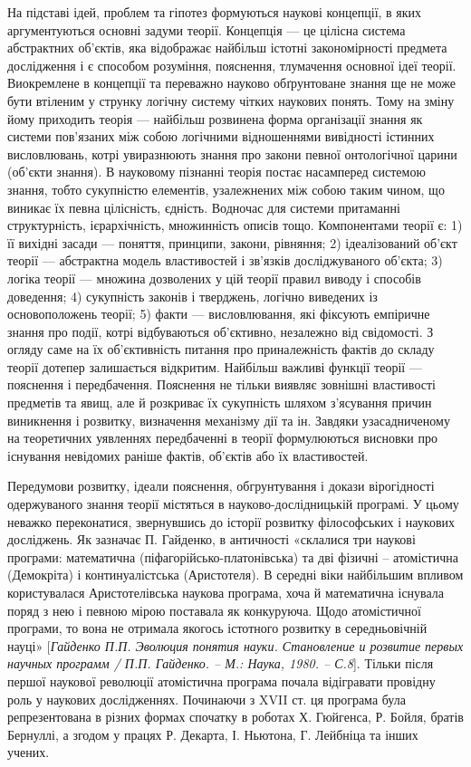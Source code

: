 На підставі ідей, проблем та гіпотез формуються наукові концепції, в яких
аргументуються основні задуми теорії. Концепція --- це цілісна система
абстрактних об’єктів, яка відображає найбільш істотні закономірності предмета
дослідження і є способом розуміння, пояснення, тлумачення основної ідеї
теорії. Виокремлене в концепції та переважно науково обґрунтоване знання ще
не може бути втіленим у струнку логічну систему чітких наукових понять.
Тому на зміну йому приходить теорія --- найбільш розвинена форма організації
знання як системи пов’язаних між собою логічними відношеннями вивідності
істинних висловлювань, котрі увиразнюють знання про закони певної
онтологічної царини (об’єкти знання). В науковому пізнанні теорія постає
насамперед системою знання, тобто сукупністю елементів, узалежнених між
собою таким чином, що виникає їх певна цілісність, єдність. Водночас для
системи притаманні структурність, ієрархічність, множинність описів тощо.
Компонентами теорії є: 1) її вихідні засади --- поняття, принципи, закони,
рівняння; 2) ідеалізований об’єкт теорії --- абстрактна модель властивостей і
зв’язків досліджуваного об’єкта; 3) логіка теорії --- множина дозволених у цій
теорії правил виводу і способів доведення; 4) сукупність законів і тверджень,
логічно виведених із основоположень теорії; 5) факти --- висловлювання, які
фіксують емпіричне знання про події, котрі відбуваються об’єктивно,
незалежно від свідомості. З огляду саме на їх об’єктивність питання про
приналежність фактів до складу теорії дотепер залишається відкритим.
Найбільш важливі функції теорії --- пояснення і передбачення. Пояснення не
тільки виявляє зовнішні властивості предметів та явищ, але й розкриває їх
сукупність шляхом з’ясування причин виникнення і розвитку, визначення
механізму дії та ін. Завдяки узасадниченому на теоретичних уявленнях
передбаченні в теорії формулюються висновки про існування невідомих раніше
фактів, об’єктів або їх властивостей.

Передумови розвитку, ідеали пояснення, обгрунтування і докази
вірогідності одержуваного знання теорії містяться в науково-дослідницькій
програмі. У цьому неважко переконатися, звернувшись до історії розвитку
філософських і наукових досліджень. Як зазначає П. Гайденко, в античності
«склалися три наукові програми: математична (піфагорійсько-платонівська) та
дві фізичні – атомістична (Демокріта) і континуалістська (Аристотеля). В
середні віки найбільшим впливом користувалася Аристотелівська наукова
програма, хоча й математична існувала поряд з нею і певною мірою поставала
як конкуруюча. Щодо атомістичної програми, то вона не отримала якогось
істотного розвитку в середньовічній науці» [\textit{Гайденко П.П. Эволюция понятия
науки. Становление и розвитие первых научных программ / П.П. Гайденко. –
М.: Наука, 1980. – С.8}]. Тільки після першої наукової революції атомістична
програма почала відігравати провідну роль у наукових дослідженнях.
Починаючи з XVII ст. ця програма була репрезентована в різних формах
спочатку в роботах Х. Гюйгенса, Р. Бойля, братів Бернуллі, а згодом у працях Р.
Декарта, І. Ньютона, Г. Лейбніца та інших учених.

